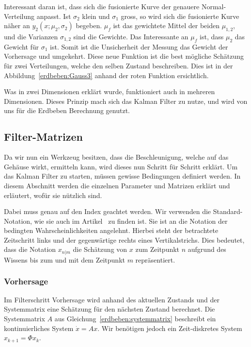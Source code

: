 Interessant daran ist, dass sich die fusionierte Kurve der genauere Normal-Verteilung anpasst.
Ist ${\sigma_2}$ klein und ${\sigma_1}$ gross,
so wird sich die fusionierte Kurve näher an ${y_2}(x;{\mu_2},{\sigma_2})$ begeben.
$\mu_f$ ist das gewichtete Mittel der beiden $\mu_{1,2}$, und die Varianzen $\sigma_{1,2}$ sind die Gewichte.
Das Interessante an $\mu_{f}$ ist, dass ${\mu_2}$ das Gewicht für ${\sigma_1}$ ist. 
Somit ist die Unsicherheit der Messung das Gewicht der Vorhersage und umgekehrt.
Diese neue Funktion ist die best mögliche Schätzung für zwei Verteilungen, welche den selben Zustand beschreiben.
Dies ist in der Abbildung~\ref{erdbeben:Gauss3} anhand der roten Funktion ersichtlich. 

Was in zwei Dimensionen erklärt wurde, funktioniert auch in mehreren Dimensionen. 
Dieses Prinzip mach sich das Kalman Filter zu nutze, und wird von uns für die Erdbeben Berechnung genutzt. 

\subsection{Filter-Matrizen}
Da wir nun ein Werkzeug besitzen, dass die Beschleunigung, welche auf das Gehäuse wirkt, ermitteln kann,
wird dieses nun Schritt für Schritt erklärt. 
Um das Kalman Filter zu starten, müssen gewisse Bedingungen definiert werden. 
In diesem Abschnitt werden die einzelnen Parameter und Matrizen erklärt und erläutert, wofür sie nützlich sind. 

Dabei muss genau auf den Index geachtet werden.
Wir verwenden die Standard-Notation, wie sie auch im Artikel~\cite{erdbeben:wikipedia} zu finden ist.
Sie ist an die Notation der bedingten Wahrscheinlichkeiten angelehnt.
Hierbei steht der betrachtete Zeitschritt links und der gegenwärtige rechts eines Vertikalstrichs.
Dies bedeutet, dass die Notation $x_{n|m}$ die Schätzung von $x$ zum Zeitpunkt $n$ 
aufgrund des Wissens bis zum und mit dem Zeitpunkt $m$ repräsentiert.

\subsubsection*{Vorhersage}
Im Filterschritt Vorhersage wird anhand des aktuellen Zustands und der Systemmatrix eine Schätzung für den nächsten Zustand berechnet. 
Die Systemmatrix $A$ aus Gleichung~\eqref{erdbeben:systemmatrix} beschreibt ein kontinuierliches System $\dot x = Ax$.
Wir benötigen jedoch ein Zeit-diskretes System $x_{k+1} = \Phi x_k$.

